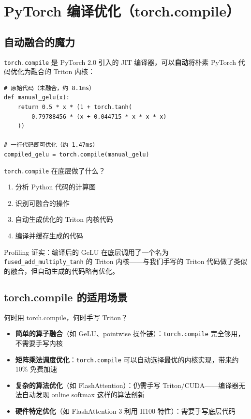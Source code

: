\section{PyTorch 编译优化（torch.compile）}

\subsection{自动融合的魔力}

\texttt{torch.compile} 是 PyTorch 2.0 引入的 JIT 编译器，可以\textbf{自动}将朴素 PyTorch 代码优化为融合的 Triton 内核：

\begin{lstlisting}[caption={torch.compile 使用示例}]
# 原始代码（未融合，约 8.1ms）
def manual_gelu(x):
    return 0.5 * x * (1 + torch.tanh(
        0.79788456 * (x + 0.044715 * x * x * x)
    ))

# 一行代码即可优化（约 1.47ms）
compiled_gelu = torch.compile(manual_gelu)
\end{lstlisting}

\texttt{torch.compile} 在底层做了什么？
\begin{enumerate}
    \item 分析 Python 代码的计算图
    \item 识别可融合的操作
    \item 自动生成优化的 Triton 内核代码
    \item 编译并缓存生成的代码
\end{enumerate}

Profiling 证实：编译后的 GeLU 在底层调用了一个名为 \texttt{fused\_add\_multiply\_tanh} 的 Triton 内核——与我们手写的 Triton 代码做了类似的融合，但自动生成的代码略有优化。

\subsection{torch.compile 的适用场景}

\begin{importantbox}{何时用 torch.compile，何时手写 Triton？}
\begin{itemize}
    \item \textbf{简单的算子融合}（如 GeLU、pointwise 操作链）：\texttt{torch.compile} 完全够用，不需要手写内核
    \item \textbf{矩阵乘法调度优化}：\texttt{torch.compile} 可以自动选择最优的内核实现，带来约 10\% 免费加速
    \item \textbf{复杂的算法优化}（如 FlashAttention）：仍需手写 Triton/CUDA——编译器无法自动发现 online softmax 这样的算法创新
    \item \textbf{硬件特定优化}（如 FlashAttention-3 利用 H100 特性）：需要手写底层代码
\end{itemize}
\end{importantbox}

